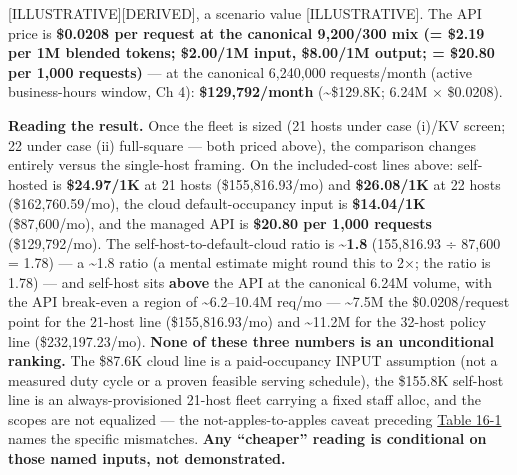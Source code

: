 \mbox{{[}ILLUSTRATIVE{]}}\hspace{0pt}\mbox{{[}DERIVED{]}}, a scenario value \mbox{{[}ILLUSTRATIVE{]}}.
The API price is \textbf{\$0.0208 per request at the canonical 9,200/300
mix (= \$2.19 per 1M blended tokens; \$2.00/1M input, \$8.00/1M output;
= \$20.80 per 1,000 requests)} --- at the canonical 6,240,000
requests/month (active business-hours window, Ch 4):
\textbf{\$129,792/month} (\textasciitilde\$129.8K; 6.24M × \$0.0208).

\textbf{Reading the result.} Once the fleet is sized (21 hosts under
case (i)/KV screen; 22 under case (ii) full-square --- both priced
above), the comparison changes entirely versus the single-host framing.
On the included-cost lines above: self-hosted is \textbf{\$24.97/1K} at
21 hosts (\$155,816.93/mo) and \textbf{\$26.08/1K} at 22 hosts
(\$162,760.59/mo), the cloud default-occupancy input is
\textbf{\$14.04/1K} (\$87,600/mo), and the managed API is
\textbf{\$20.80 per 1,000 requests} (\$129,792/mo). The
self-host-to-default-cloud ratio is \textbf{\textasciitilde1.8}
(155,816.93 ÷ 87,600 = 1.78) --- a \textasciitilde1.8 ratio (a mental
estimate might round this to 2×; the ratio is 1.78) --- and self-host
sits \textbf{above} the API at the canonical 6.24M volume, with the API
break-even a region of \textasciitilde6.2--10.4M req/mo ---
\textasciitilde7.5M the \$0.0208/request point for the 21-host line
(\$155,816.93/mo) and \textasciitilde11.2M for the 32-host policy line
(\$232,197.23/mo). \textbf{None of these three numbers is an
unconditional ranking.} The \$87.6K cloud line is a paid-occupancy INPUT
assumption (not a measured duty cycle or a proven feasible serving
schedule), the \$155.8K self-host line is an always-provisioned 21-host
fleet carrying a fixed staff alloc, and the scopes are not equalized ---
the not-apples-to-apples caveat preceding \hyperref[tab:16.1]{Table 16-1} names the specific
mismatches. \textbf{Any ``cheaper'' reading is conditional on those
named inputs, not demonstrated.}

